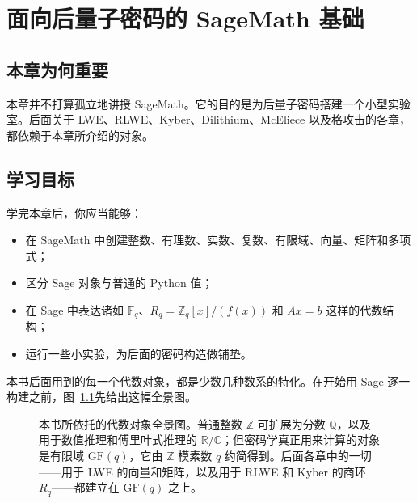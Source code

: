 \chapter{面向后量子密码的 SageMath 基础}
\label{ch:sagemath}

\section{本章为何重要}
本章并不打算孤立地讲授 SageMath。它的目的是为后量子密码搭建一个小型实验室。后面关于 LWE、RLWE、Kyber、Dilithium、McEliece 以及格攻击的各章，都依赖于本章所介绍的对象。

\section{学习目标}
学完本章后，你应当能够：

\begin{itemize}
  \item 在 SageMath 中创建整数、有理数、实数、复数、有限域、向量、矩阵和多项式；
  \item 区分 Sage 对象与普通的 Python 值；
  \item 在 Sage 中表达诸如 $\mathbb{F}_q$、$R_q = \mathbb{Z}_q[x]/(f(x))$ 和 $Ax=b$ 这样的代数结构；
  \item 运行一些小实验，为后面的密码构造做铺垫。
\end{itemize}

本书后面用到的每一个代数对象，都是少数几种数系的特化。在开始用 Sage 逐一构建之前，图~\ref{fig:number-systems}先给出这幅全景图。

\begin{figure}[H]
\centering
{}
\caption{本书所依托的代数对象全景图。普通整数 $\mathbb{Z}$ 可扩展为分数 $\mathbb{Q}$，以及用于数值推理和傅里叶式推理的 $\mathbb{R}/\mathbb{C}$；但密码学真正用来计算的对象是有限域 $\mathrm{GF}(q)$，它由 $\mathbb{Z}$ 模素数 $q$ 约简得到。后面各章中的一切——用于 LWE 的向量和矩阵，以及用于 RLWE 和 Kyber 的商环 $R_q$——都建立在 $\mathrm{GF}(q)$ 之上。}
\label{fig:number-systems}
\end{figure}


